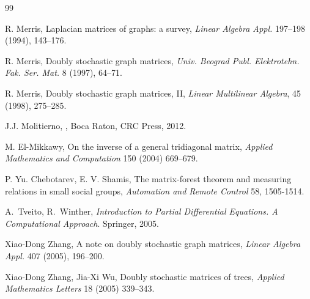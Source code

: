 \documentclass[12pt]{article}
\begin{document}
\begin{thebibliography}{99}

 R. Merris, Laplacian matrices of graphs: a survey, {\em Linear Algebra Appl.} 197--198 (1994), 143--176.

 R. Merris, Doubly stochastic graph matrices, {\em  Univ. Beograd Publ. Elektrotehn. Fak. Ser. Mat.} 8 (1997), 64--71. 

 R. Merris, Doubly stochastic graph matrices, II, {\em Linear  Multilinear Algebra}, 45  (1998), 275--285.


  J.J. Molitierno,
, 
\newblock Boca Raton,  CRC Press,  2012.

 M. El-Mikkawy, On the inverse of a general tridiagonal matrix,  {\em Applied Mathematics and Computation} 150 (2004) 669--679.



 P. Yu. Chebotarev, E. V. Shamis,  The matrix-forest theorem and measuring relations in small social groups, {\em Automation and Remote Control} 58, 1505-1514.


A.~Tveito, R.~Winther, {\em Introduction to Partial Differential Equations. A Computational Approach}. Springer, 2005.


 Xiao-Dong Zhang, A note on doubly stochastic graph matrices, {\em Linear Algebra Appl.} 407 (2005), 196--200.

 Xiao-Dong Zhang, Jia-Xi Wu, Doubly stochastic matrices of trees, {\em Applied Mathematics Letters} 18 (2005) 339--343.

\end{thebibliography}
\end{document}
